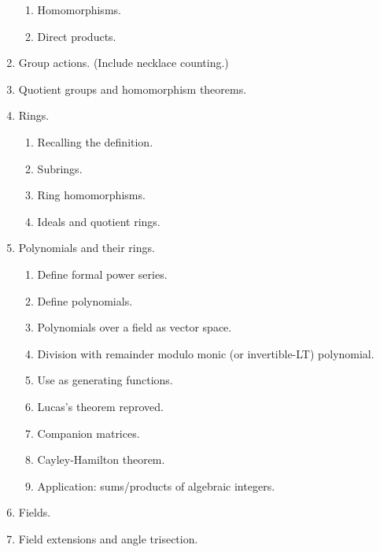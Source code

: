 \documentclass[numbers=enddot,12pt,final,onecolumn,notitlepage]{scrartcl}%
\theoremstyle{definition}
\begin{document}
\begin{enumerate}
\begin{enumerate}
\item Homomorphisms.

\item Direct products.
\end{enumerate}

\item Group actions. (Include necklace counting.)

\item Quotient groups and homomorphism theorems.

\item Rings.

\begin{enumerate}
\item Recalling the definition.

\item Subrings.

\item Ring homomorphisms.

\item Ideals and quotient rings.
\end{enumerate}

\item Polynomials and their rings.

\begin{enumerate}
\item Define formal power series.

\item Define polynomials.

\item Polynomials over a field as vector space.

\item Division with remainder modulo monic (or invertible-LT) polynomial.

\item Use as generating functions.

\item Lucas's theorem reproved.

\item Companion matrices.

\item Cayley-Hamilton theorem.

\item Application: sums/products of algebraic integers.
\end{enumerate}

\item Fields.

\item Field extensions and angle trisection.


\end{enumerate}
\end{document}
